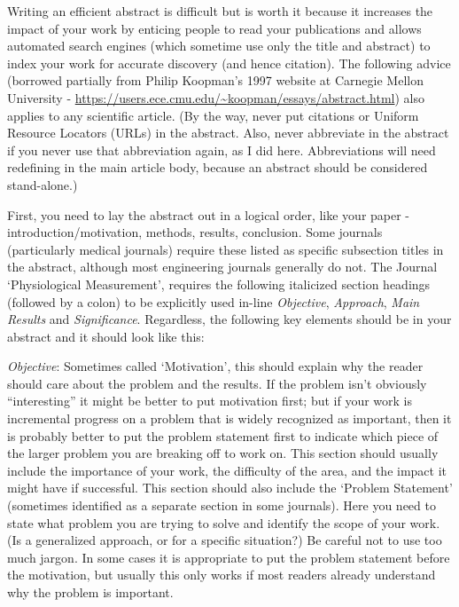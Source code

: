 Writing an efficient abstract is difficult but is worth it because it increases the impact of your work by enticing people to read your publications and allows automated search engines (which sometime use only the title and abstract) to index your work for accurate discovery (and hence citation). The following advice (borrowed partially from Philip Koopman's 1997 website at Carnegie Mellon University - 
\url{https://users.ece.cmu.edu/~koopman/essays/abstract.html}) also applies to any scientific article. 
(By the way, never put citations or Uniform Resource Locators (URLs) in the abstract. Also, never abbreviate in the abstract if you never use that abbreviation again, as I did here. Abbreviations will need redefining in the main article body, because an abstract should be considered stand-alone.) 
\par
First, you need to lay the abstract out in a logical order, like your paper - introduction/motivation, methods, results, conclusion. Some journals (particularly medical journals) require these listed as specific subsection titles in the abstract, although most engineering journals generally do not. 
The Journal `Physiological Measurement', requires the following italicized section headings (followed by a colon) to be explicitly used in-line {\it Objective}, {\it Approach}, {\it Main Results} and {\it Significance}. Regardless, the following key elements should be in your abstract and it should look like this:

{\it Objective}: Sometimes called `Motivation', this should explain why the reader should care about the problem and the results. If the problem isn't obviously ``interesting'' it might be better to put motivation first; but if your work is incremental progress on a problem that is widely recognized as important, then it is probably better to put the problem statement first to indicate which piece of the larger problem you are breaking off to work on.
This section should usually include the importance of your work, the difficulty of the area, and the impact it might have if successful.
This section should also include the `Problem Statement' (sometimes identified as a separate section in some journals). Here you need to state what problem  you are trying to solve and identify the scope of your work. (Is a generalized approach, or for a specific situation?) Be careful not to use too much jargon. In some cases it is appropriate to put the problem statement before the motivation, but usually this only works if most readers already understand why the problem is important.

